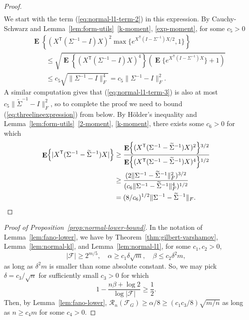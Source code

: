 \documentclass[letterpaper]{amsart}
\DeclarePairedDelimiter{\norm}{\lVert}{\rVert}
\newcommand{\sF}{\mathcal{F}}
\newcommand{\sR}{\mathcal{R}}
\DeclareMathOperator{\E}{\mathbf{E}}
\let\originalleft\left
\let\originalright\right
\def\left#1{\mathopen{}\originalleft#1}
\def\right#1{\originalright#1\mathclose{}}
\renewcommand{\eqref}[1]{(\ref{eq:#1})}
\newcommand{\thmref}[1]{Theorem~\ref{thm:#1}}
\numberwithin{thm}{section}
\newcommand{\lemref}[1]{Lemma~\ref{lem:#1}}
\newcommand{\propref}[1]{Proposition~\ref{prop:#1}}
\theoremstyle{definition}
\theoremstyle{plain}
\renewcommand{\tilde}[1]{\widetilde{#1}}
\newcommand{\transpose}{^{\mathsf{T}}}
\begin{document}
\begin{proof}
\begin{align}
  \end{align}
  We start with the term \eqref{normal-l1-term-2} in this expression. By Cauchy-Schwarz
  and \lemref{form-utils}~\ref{k-moment}, \ref{exp-moment}, for some $c_5 > 0$
  \begin{align*}
    &\E\left\{ (X\transpose (\Sigma^{-1} - I)X)^2 \max\{e^{X\transpose (I - \Sigma^{-1}) X/2}, 1\} \right\} \\
    &\qquad \le \sqrt{\E\left\{(X\transpose (\Sigma^{-1} - I) X)^4\right\} \left( \E\{e^{X\transpose (I - \Sigma^{-1}) X}\} + 1\right) } \\
                                                                                           &\qquad \le c_5 \sqrt{ \|\Sigma^{-1} - I\|_F^4} = c_5 \|\Sigma^{-1} - I\|_F^2.
  \end{align*}
  A similar computation gives that \eqref{normal-l1-term-3} is also at
  most $c_5\|\tilde{\Sigma}^{-1} - I\|_F^2$, so to complete the proof
  we need to bound \eqref{threelineexpression} from below. By
  H\"{o}lder's inequality and \lemref{form-utils}~\ref{2-moment},
  \ref{k-moment}, there exists some $c_6 > 0$ for which
  \begin{align*}
    \E\left\{|X\transpose (\Sigma^{-1} - \tilde{\Sigma}^{-1}) X| \right\} &\ge \frac{\E\left\{ (X\transpose (\Sigma^{-1} - \tilde{\Sigma}^{-1})X)^2\right\}^{3/2}}{\E\left\{ (X\transpose (\Sigma^{-1} - \tilde{\Sigma}^{-1})X)^4\right\}^{1/2}} \\
                                                                          &\ge \frac{(2\norm{\Sigma^{-1} - \tilde{\Sigma}^{-1}}_F^2)^{3/2}}{ (c_6 \|\Sigma^{-1} - \tilde{\Sigma}^{-1}\|_F^4)^{1/2}} \\
    &= (8/c_6)^{1/2} \|\Sigma^{-1} - \tilde{\Sigma}^{-1}\|_F . \qedhere
  \end{align*}
\end{proof}

\begin{proof}[Proof of \propref{normal-lower-bound}]
  In the notation of \lemref{fano-lower}, we have by
  \thmref{gilbert-varshamov}, \lemref{normal-kl}, and
  \lemref{normal-l1}, for some $c_1, c_2 > 0$,
  \[
    |\sF| \ge 2^{m/5}, \quad \alpha \ge c_1 \delta \sqrt{m}, \quad \beta \le c_2 \delta^2 m, 
  \]
  as long as $\delta^2m$ is smaller than some absolute constant.  So,
  we may pick $\delta = c_3/\sqrt{n}$ for sufficiently small $c_3 > 0$
  for which
  \[
    1 - \frac{n \beta + \log 2}{\log |\sF|} \ge \frac{1}{2} .
  \]
  Then, by \lemref{fano-lower},
  $\sR_n(\sF_G) \ge \alpha/8 \ge (c_1 c_3/8) \sqrt{m/n}$ as long as
  $n \ge c_4 m$ for some $c_4> 0$.
\end{proof}
\end{document}
